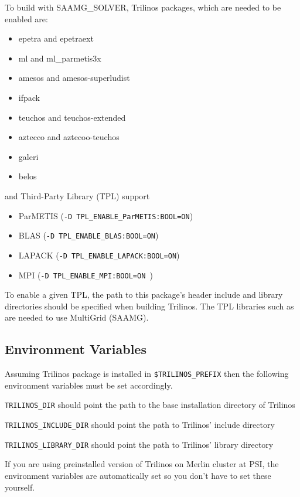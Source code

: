 To build {\opal} with {SAAMG\_SOLVER}, Trilinos packages, which are needed to be enabled are:
\begin{itemize}
  \item epetra and epetraext
  \item ml and ml\_parmetis3x
  \item amesos and amesos-superludist
  \item ifpack
  \item teuchos and teuchos-extended
  \item aztecco and aztecoo-teuchos
  \item galeri
  \item belos
\end{itemize}
and Third-Party Library (TPL) support
 \begin{itemize}
  \item ParMETIS (\texttt{-D TPL\_ENABLE\_ParMETIS:BOOL=ON})
  \item BLAS  (\texttt{-D TPL\_ENABLE\_BLAS:BOOL=ON})
  \item LAPACK (\texttt{-D TPL\_ENABLE\_LAPACK:BOOL=ON})
  \item MPI (\texttt{-D TPL\_ENABLE\_MPI:BOOL=ON })
\end{itemize}
To enable a given TPL,  the path to this package's header include and library directories should be specified
when building Trilinos. The TPL libraries such as  are needed
to use MultiGrid (SAAMG).

\subsection{Environment Variables}
\label{ssec:envvar_MG}

Assuming Trilinos package is installed in \texttt{\$TRILINOS\_PREFIX} then the following environment variables must be set accordingly.

\texttt{TRILINOS\_DIR} should point the path to the base installation directory of Trilinos

\texttt{TRILINOS\_INCLUDE\_DIR} should point the path to Trilinos' include directory

\texttt{TRILINOS\_LIBRARY\_DIR} should point the path to Trilinos' library directory

If you are using preinstalled version of Trilinos on Merlin cluster at PSI, the environment variables
are automatically set so you don't have to set these yourself.

